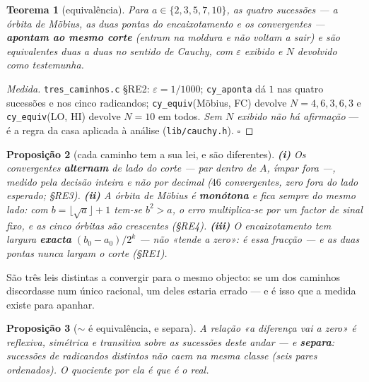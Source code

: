\documentclass[11pt,a4paper]{article}
\newtheorem{teorema}{Teorema}
\newtheorem{proposicao}[teorema]{Proposição}
\newcommand{\code}[1]{\texttt{\small #1}}
\begin{document}
\begin{teorema}[equivalência]\label{thm:tres}
Para $a\in\{2,3,5,7,10\}$, as quatro sucessões --- a órbita de Möbius, as duas
pontas do encaixotamento e os convergentes --- \textbf{apontam ao mesmo corte}
(entram na moldura e não voltam a sair) e são equivalentes duas a duas no
sentido de Cauchy, com $\varepsilon$ \emph{exibido} e $N$ devolvido como
testemunha.
\end{teorema}

\begin{proof}[Medida]
\code{tres\_caminhos.c} §RE2: $\varepsilon=1/1000$; \code{cy\_aponta} dá $1$ nas
quatro sucessões e nos cinco radicandos; \code{cy\_equiv}(Möbius, FC) devolve
$N=4,6,3,6,3$ e \code{cy\_equiv}(LO, HI) devolve $N=10$ em todos.
\emph{Sem $N$ exibido não há afirmação} --- é a regra da casa aplicada à
análise (\code{lib/cauchy.h}). $\square$
\end{proof}

\begin{proposicao}[cada caminho tem a sua lei, e são diferentes]\label{prop:leis3}
\textbf{(i)} Os convergentes \textbf{alternam} de lado do corte --- par dentro
de $A$, ímpar fora ---, medido pela decisão inteira e não por decimal ($46$
convergentes, zero fora do lado esperado; §RE3).
\textbf{(ii)} A órbita de Möbius é \textbf{monótona} e fica sempre do
\emph{mesmo} lado: com $b=\lfloor\sqrt a\rfloor+1$ tem-se $b^{2}>a$, o erro
multiplica-se por um factor de sinal fixo, e as cinco órbitas são crescentes
(§RE4).
\textbf{(iii)} O encaixotamento tem largura \textbf{exacta}
$(b_0-a_0)/2^{k}$ --- não «tende a zero»: \emph{é} essa fracção --- e as duas
pontas nunca largam o corte (§RE1).
\end{proposicao}

\noindent São três leis distintas a convergir para o mesmo objecto: se um dos
caminhos discordasse num único racional, um deles estaria errado --- e é isso
que a medida existe para apanhar.

\begin{proposicao}[$\sim$ é equivalência, e separa]\label{prop:classe}
A relação «a diferença vai a zero» é reflexiva, simétrica e transitiva sobre as
sucessões deste andar --- e \textbf{separa}: sucessões de radicandos distintos
não caem na mesma classe (seis pares ordenados). O quociente por ela é que
\emph{é} o real.
\end{proposicao}
\end{document}
